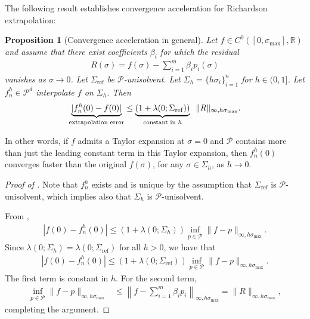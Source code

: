 \documentclass[10pt]{article} %
\newcommand{\nugget}{\sigma}
\newtheorem{proposition}{Proposition}
\begin{document}
The following result establishes convergence acceleration for Richardson extrapolation:

\begin{proposition}[Convergence acceleration in general]
\label{thm: conv acc}
Let $f \in C^0([0,\nugget_{\max}],\mathbb{R})$ and assume that there exist coefficients $\beta_i$ for which the residual
\begin{align}
R(\sigma) = f(\sigma) - \sum_{ i = 1 }^m \beta_i p_i( \sigma )  \label{eq: error}
\end{align}
vanishes as $\sigma \rightarrow 0$.
Let $\Sigma_{\mathrm{ref}}$ be $\mathcal{P}$-unisolvent.
Let $\Sigma_h = \{ h \sigma_i\}_{i=1}^n$ for $h \in (0,1]$. 
Let $f_n^h \in \mathcal{P}^d$ interpolate $f$ on $\Sigma_h$.
Then 
\begin{align*}
\underbrace{ |  f_n^h(0) - f(0) | }_{\text{\normalfont extrapolation error}} \leq \underbrace{ ( 1 + \lambda(0; \Sigma_{\mathrm{ref}}) ) }_{\text{\normalfont constant in $h$}} \; \; \| R \|_{\infty, h \nugget_{\max}} .
\end{align*}
\end{proposition}

\noindent In other words, if $f$ admits a Taylor expansion at $\sigma = 0$ and $\mathcal{P}$ contains more than just the leading constant term in this Taylor expansion, then $f_n^h(0)$ converges faster than the original $f(\sigma)$, for any $\sigma \in \Sigma_h$, as $h \rightarrow 0$.
\begin{proof}[Proof of ]
Note that $f_n^h$ exists and is unique by the assumption that $\Sigma_{\mathrm{ref}}$ is $\mathcal{P}$-unisolvent, which implies also that $\Sigma_h$ is $\mathcal{P}$-unisolvent.

From ,
\begin{align*}
| f(0) - f_n^h(0) | \leq (1 + \lambda(0; \Sigma_h)) \inf_{p \in \mathcal{P}} \| f - p \|_{\infty , h\nugget_{\max} } .
\end{align*}
Since $\lambda(0; \Sigma_h) = \lambda (0; \Sigma_{\mathrm{ref}})$ for all $h > 0$, we have that
\begin{align*}
| f(0) - f_n^h(0) | \leq (1 + \lambda(0; \Sigma_{\mathrm{ref}})) \inf_{p \in \mathcal{P}} \| f - p \|_{\infty , h\nugget_{\max} } .
\end{align*}
The first term is constant in $h$.
For the second term,
\begin{align*}
\inf_{p \in \mathcal{P}} \| f - p \|_{\infty , h\nugget_{\max} }  & \leq \left\| f - \sum_{i=1}^m \beta_i p_i \right\|_{\infty,h \nugget_{\max} } = \| R \|_{\infty,h \nugget_{\max} } ,
\end{align*}
completing the argument.
\end{proof}
\end{document}
